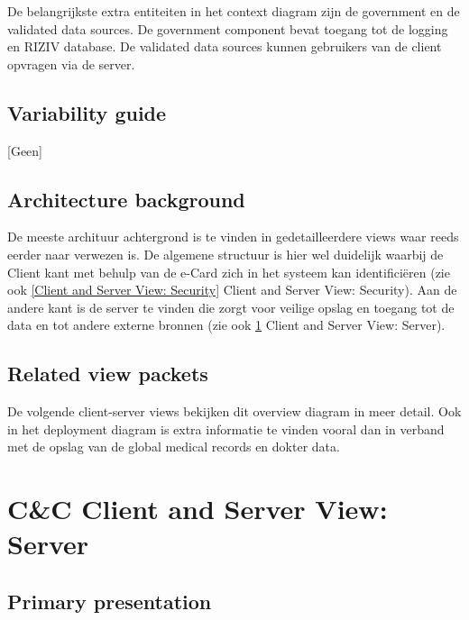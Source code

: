 \documentclass[a4paper,10pt]{article}
\begin{document}
De belangrijkste extra entiteiten in het context diagram zijn de government en de validated data sources.  De government component bevat toegang tot de logging en RIZIV database.  De validated data sources kunnen gebruikers van de client opvragen via de server.

\subsection{Variability guide}
[Geen]

\subsection{Architecture background}
De meeste archituur achtergrond is te vinden in gedetailleerdere views waar reeds eerder naar verwezen is.  De algemene structuur is hier wel duidelijk waarbij de Client kant met behulp van de e-Card zich in het systeem kan identifici\"{e}ren (zie ook \ref{Client and Server View: Security} Client and Server View: Security).  Aan de andere kant is de server te vinden die zorgt voor veilige opslag en toegang tot de data en tot andere externe bronnen (zie ook \ref{Client and Server View: Server} Client and Server View: Server).

\subsection{Related view packets}
De volgende client-server views bekijken dit overview diagram in meer detail.  Ook in het deployment diagram is extra informatie te vinden vooral dan in verband met de opslag van de global medical records en dokter data.



\clearpage
\section{C\&C Client and Server View: Server}
\label{Client and Server View: Server}
\subsection{Primary presentation}
\end{document}
